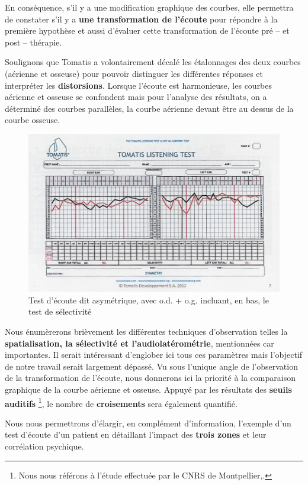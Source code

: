  En  conséquence,  s'il y a une modification
          graphique des courbes, elle
          permettra de constater s'il y a \textbf{une transformation de l'écoute}
          pour répondre à la première hypothèse et aussi d'évaluer cette transformation de l'écoute pré -- et
          post -- thérapie.




Soulignons que Tomatis a volontairement décalé les étalonnages des deux courbes (aérienne et osseuse) pour pouvoir distinguer les différentes réponses et interpréter
	les \textbf{distorsions}. Lorsque l'écoute est harmonieuse, les
	courbes aérienne et osseuse se confondent mais pour l'analyse des
	résultats, on a déterminé des courbes parallèles, la courbe aérienne
	devant être au dessus de la courbe osseuse.


\begin{figure}
	\centering
	\includegraphics[width=0.7\linewidth]{images/tomatisListeningTest.jpg}
	\caption[Test d'écoute]{Test
          d'écoute dit asymétrique, avec o.d. + o.g. incluant, en bas, le test de sélectivité}
	\label{fig:tomatislisteningtest}
\end{figure}



Nous énumèrerons brièvement les
différentes techniques d'observation telles la
\textbf{spatialisation, la
sélectivité et l'audiolatérométrie}, mentionnées car importantes.
 Il serait intéressant d'englober ici tous ces paramètres mais
  l'objectif de notre travail serait largement dépassé.
Vu sous l'unique angle de l'observation de la transformation de l'écoute, nous
donnerons ici la priorité à la comparaison graphique
de la courbe aérienne et osseuse. Appuyé par les résultats
des \textbf{seuils auditifs}
\footnote{Nous nous référons à
  l'étude effectuée par le CNRS de Montpellier,\autocite{affectiveDisorders}.},
le nombre de \textbf{croisements }sera
également quantifié.

Nous nous permettrons d'élargir, en
complément d'information, l'exemple d'un test d'écoute d'un patient en détaillant l'impact
des\textbf{ trois zones} et leur corrélation psychique.



